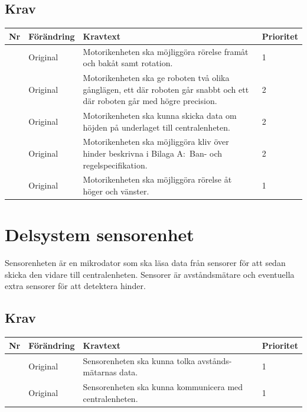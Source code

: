 \documentclass[a4paper,titlepage,12pt]{article}
\newcounter{reqNr}
\newcommand{\nextReqNr}{\stepcounter{reqNr}\arabic{reqNr}}
\begin{document}
	\subsection{Krav}
	\begin{longtable}[c]{ c l>{\raggedright}p{} l }
		\textbf{Nr} & \textbf{Förändring} & \textbf{Kravtext} & \textbf{Prioritet} 
			\\ \midrule

		\nextReqNr{} & Original & Motorikenheten ska möjliggöra rörelse framåt och 
			bakåt samt rotation. & 1
			\\ \midrule

		\nextReqNr{} & Original & Motorikenheten ska ge roboten två olika gånglägen,
			ett där roboten går 
			snabbt och ett där roboten går med högre precision.& 2
			\\ \midrule

		\nextReqNr{} & Original & Motorikenheten ska kunna skicka data om höjden 
			på underlaget till centralenheten. & 2
			\\ \midrule

		\nextReqNr{} & Original & Motorikenheten ska möjliggöra kliv över hinder 
			beskrivna i Bilaga A:\
			Ban- och regelspecifikation. & 2
			\\ \midrule

		\nextReqNr & Original & Motorikenheten ska möjliggöra rörelse åt höger
			och vänster. & 1

	\end{longtable}


	\section{Delsystem sensorenhet}
	Sensorenheten är en mikrodator som ska läsa data från sensorer för att sedan skicka 
	den vidare till centralenheten. Sensorer är avståndsmätare och eventuella extra sensorer 
	för att detektera hinder.

	\subsection{Krav}
	\begin{longtable}[c]{ c l>{\raggedright}p{} l }
		\textbf{Nr} & \textbf{Förändring} & \textbf{Kravtext} & \textbf{Prioritet} 
			\\ \midrule

		\nextReqNr{} & Original & Sensorenheten ska kunna tolka avstånds- mätarnas data. & 1
			\\ \midrule

		\nextReqNr{} & Original & Sensorenheten ska kunna kommunicera med 
			centralenheten. & 1

	\end{longtable}
\end{document}
